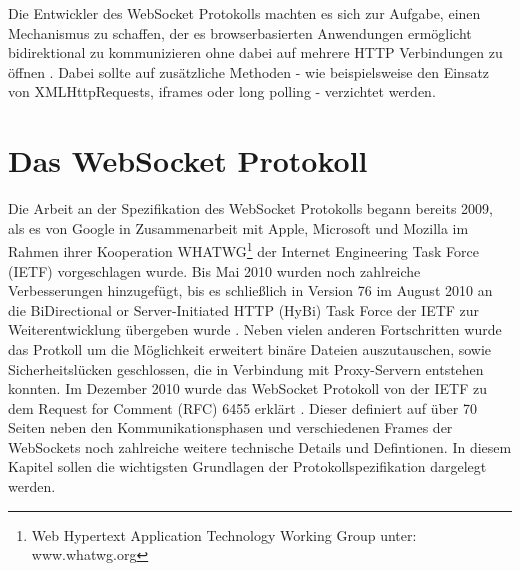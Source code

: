 \documentclass[11pt,a4paper,titlepage]{scrartcl}
\numberwithin{equation}{section}
\begin{document}
\noindent Die Entwickler des WebSocket Protokolls machten es sich zur Aufgabe, einen Mechanismus zu schaffen, der es browserbasierten Anwendungen ermöglicht bidirektional zu kommunizieren ohne dabei auf mehrere HTTP Verbindungen zu öffnen \autocite{fette_websocket_2011}. Dabei sollte auf zusätzliche Methoden - wie beispielsweise den Einsatz von XMLHttpRequests, iframes oder long polling - verzichtet werden.

\newpage
\section{Das WebSocket Protokoll}\label{sec:WebSocketProtokoll}
Die Arbeit an der Spezifikation des WebSocket Protokolls begann bereits 2009, als es von Google in Zusammenarbeit mit Apple, Microsoft und Mozilla im Rahmen ihrer Kooperation WHATWG\footnote{Web Hypertext Application Technology Working Group unter: www.whatwg.org} der Internet Engineering Task Force (IETF) vorgeschlagen wurde. Bis Mai 2010 wurden noch zahlreiche Verbesserungen hinzugefügt, bis es schließlich in Version 76 \autocite{hickson_websocket_2010} im August 2010 an die BiDirectional or Server-Initiated HTTP (HyBi) Task Force der IETF zur Weiterentwicklung übergeben wurde \autocite{fette_websocket_2010}. Neben vielen anderen Fortschritten wurde das Protkoll um die Möglichkeit erweitert binäre Dateien auszutauschen, sowie Sicherheitslücken geschlossen, die in Verbindung mit Proxy-Servern entstehen konnten. Im Dezember 2010 wurde das WebSocket Protokoll von der IETF zu dem Request for Comment (RFC) 6455 erklärt \autocite{fette_websocket_2011}. Dieser definiert auf über 70 Seiten neben den Kommunikationsphasen und verschiedenen Frames der WebSockets noch zahlreiche weitere technische Details und Defintionen. In diesem Kapitel sollen die wichtigsten Grundlagen der Protokollspezifikation dargelegt werden.
\end{document}
